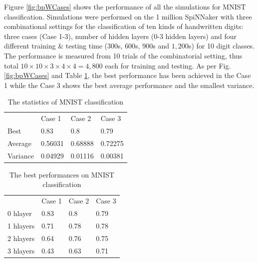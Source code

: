 \documentclass[letterpaper, 10 pt, conference]{ieeeconf}  %
\begin{document}
Figure \ref{fig:bpWCases} shows the performance of all the simulations for MNIST classification.
Simulations were performed on the 1 million SpiNNaker \cite{brown2018spinnaker} with three combinational settings for the classification of ten kinds of handwritten digits: three cases (Case 1-3), number of hidden layers (0-3 hidden layers) and four different training \& testing time ($300$s, $600$s, $900$s and $1,200$s) for 10 digit classes. 
The performance is measured from 10 trials of the combinatorial setting, thus total $10 \times 10 \times 3 \times 4 \times 4 = 4,800$  each for training and testing. 
As per Fig. \ref{fig:bpWCases} and Table \ref{tab:sim_stat}, the best performance has been achieved in the Case 1 while the Case 3 shows the best average performance and the smallest variance. 
\setlength{\tabcolsep}{4pt}
\begin{table}
\setlength{\tabcolsep}{12pt} %
\begin{center}
\caption{The statistics of MNIST classification}
\label{tab:sim_stat}
\begin{tabular}{ llll }
\hline\noalign{\smallskip}
     ~          & Case 1    & Case 2    & Case 3    \\ 
\noalign{\smallskip}
\hline
\noalign{\smallskip}    
    Best 	    & 0.83	    & 0.8 	    & 0.79      \\ %
    Average 	& 0.56031	& 0.68888 	& 0.72275   \\ %
    Variance 	& 0.04929	& 0.01116	& 0.00381   \\ %
\hline
\end{tabular}
\end{center}
\end{table}
\setlength{\tabcolsep}{1.4pt}


\setlength{\tabcolsep}{4pt}
\begin{table}
\setlength{\tabcolsep}{12pt} %
\begin{center}
\caption{The best performances on MNIST classification}
\label{tab:sim_best}
\begin{tabular}{ llll }
\hline\noalign{\smallskip}
     ~          & Case 1    & Case 2    & Case 3    \\ 
\noalign{\smallskip}
\hline
\noalign{\smallskip}    
    0 hlayer 	& 0.83	    & 0.8	    & 0.79   \\
    1 hlayers 	& 0.71  	& 0.78   	& 0.78   \\
    2 hlayers	& 0.64  	& 0.76  	& 0.75   \\
    3 hlayers 	& 0.43  	& 0.63  	& 0.71   \\
\hline
\end{tabular}
\end{center}
\end{table}
\setlength{\tabcolsep}{1.4pt}
\end{document}
